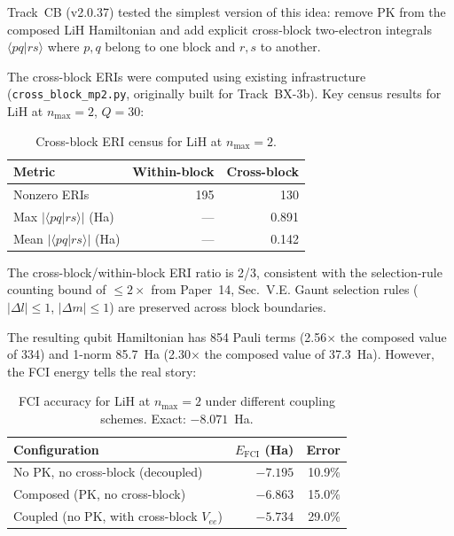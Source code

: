 \documentclass[aps,pra,twocolumn,superscriptaddress,longbibliography]{revtex4-2}
\begin{document}
Track~CB (v2.0.37) tested the simplest version of this idea: remove
PK from the composed LiH Hamiltonian and add explicit cross-block
two-electron integrals $\langle pq | rs \rangle$ where $p, q$ belong
to one block and $r, s$ to another.

The cross-block ERIs were computed using existing infrastructure
(\texttt{cross\_block\_mp2.py}, originally built for Track~BX-3b).
Key census results for LiH at $n_{\max} = 2$, $Q = 30$:

\begin{table}[h]
\caption{Cross-block ERI census for LiH at $n_{\max} = 2$.}
\label{tab:census}
\begin{ruledtabular}
\begin{tabular}{lrr}
Metric & Within-block & Cross-block \\
\hline
Nonzero ERIs & 195 & 130 \\
Max $|\langle pq|rs\rangle|$ (Ha) & --- & 0.891 \\
Mean $|\langle pq|rs\rangle|$ (Ha) & --- & 0.142 \\
\end{tabular}
\end{ruledtabular}
\end{table}

The cross-block/within-block ERI ratio is 2/3, consistent with the
selection-rule counting bound of $\le 2\times$ from Paper~14,
Sec.~V.E.  Gaunt selection rules ($|\Delta l| \le 1$,
$|\Delta m| \le 1$) are preserved across block boundaries.

The resulting qubit Hamiltonian has 854 Pauli terms (2.56$\times$ the
composed value of 334) and 1-norm 85.7~Ha (2.30$\times$ the composed
value of 37.3~Ha).  However, the FCI energy tells the real story:

\begin{table}[h]
\caption{FCI accuracy for LiH at $n_{\max} = 2$ under different
coupling schemes.  Exact: $-8.071$~Ha.}
\label{tab:fci}
\begin{ruledtabular}
\begin{tabular}{lrr}
Configuration & $E_{\mathrm{FCI}}$ (Ha) & Error \\
\hline
No PK, no cross-block (decoupled) & $-7.195$ & 10.9\% \\
Composed (PK, no cross-block) & $-6.863$ & 15.0\% \\
Coupled (no PK, with cross-block $V_{ee}$) & $-5.734$ & 29.0\% \\
\end{tabular}
\end{ruledtabular}
\end{table}
\end{document}
